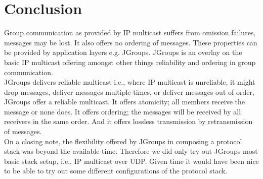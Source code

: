 \section{Conclusion}
\label{jgroup_conclusion}
Group communication as provided by IP multicast suffers from omission failures, messages may be lost. It also offers no ordering of messages. These properties can be provided by application layers e.g. JGroups. JGroups is an overlay on the basic IP multicast offering amongst other things reliability and ordering in group communication. \\

JGroups delivers reliable multicast i.e., where IP multicast is unreliable, it might drop messages, deliver messages multiple times, or deliver messages out of order, JGroups offer a reliable multicast. It offers atomicity; all members receive the message or none does. It offers ordering; the messages will be received by all receivers in the same order. And it offers lossless transmission by retransmission of messages.\\

On a closing note, the flexibility offered by JGroups in composing a protocol stack was beyond the available time. Therefore we did only try out JGroups most basic stack setup, i.e., IP multicast over UDP. Given time it would have been nice to be able to try out some different configurations of the protocol stack.  

